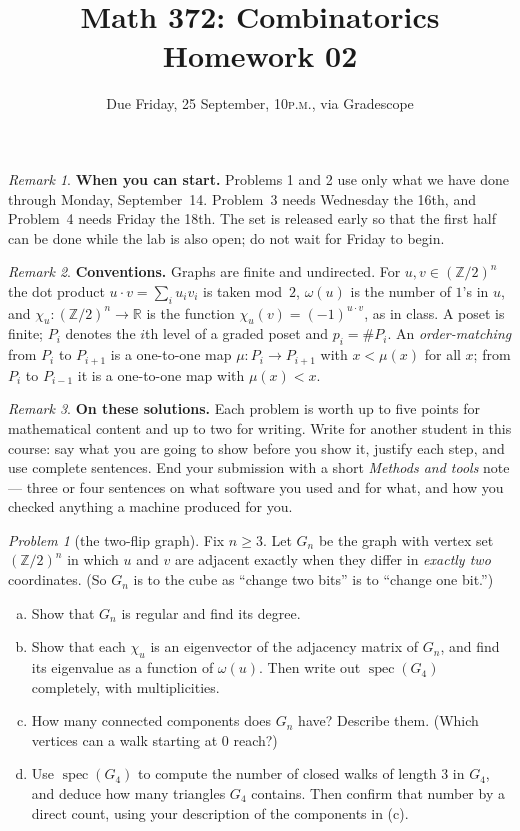 \documentclass[11pt,twoside]{amsart}
\title{Math 372: Combinatorics\\ Homework 02}
\author{Due Friday, 25 September, 10\textsc{p.m.}, via Gradescope}
\theoremstyle{plain}
\theoremstyle{remark}
\newtheorem*{rmk*}{Remark}
\newtheorem{prob}{Problem}
\theoremstyle{definition}
\newcommand{\RR}{\mathbb{R}}
\newcommand{\Ztn}{(\mathbb{Z}/2)^{n}}
\newcommand{\spec}{\operatorname{spec}}
\newcommand{\wt}{\omega}
\begin{document}
\maketitle

\begin{rmk*}
\textbf{When you can start.} Problems 1 and 2 use only what we have done through Monday,
September~14. Problem~3 needs Wednesday the 16th, and Problem~4 needs Friday the 18th. The set is
released early so that the first half can be done while the lab is also open; do not wait for
Friday to begin.
\end{rmk*}

\begin{rmk*}
\textbf{Conventions.} Graphs are finite and undirected. For $u,v\in\Ztn$ the dot product
$u\cdot v=\sum_i u_iv_i$ is taken mod~$2$, $\wt(u)$ is the number of $1$'s in $u$, and
$\chi_u\colon\Ztn\to\RR$ is the function $\chi_u(v)=(-1)^{u\cdot v}$, as in class. A poset is
finite; $P_i$ denotes the $i$th level of a graded poset and $p_i=\#P_i$. An \emph{order-matching}
from $P_i$ to $P_{i+1}$ is a one-to-one map $\mu\colon P_i\to P_{i+1}$ with $x<\mu(x)$ for all
$x$; from $P_{i}$ to $P_{i-1}$ it is a one-to-one map with $\mu(x)<x$.
\end{rmk*}

\begin{rmk*}
\textbf{On these solutions.} Each problem is worth up to five points for mathematical content
and up to two for writing. Write for another student in this course: say what you are going to
show before you show it, justify each step, and use complete sentences. End your submission with
a short \emph{Methods and tools} note --- three or four sentences on what software you used and
for what, and how you checked anything a machine produced for you.
\end{rmk*}

\begin{prob}[the two-flip graph]
Fix $n\ge3$. Let $G_n$ be the graph with vertex set $\Ztn$ in which $u$ and $v$ are adjacent
exactly when they differ in \emph{exactly two} coordinates. (So $G_n$ is to the cube as ``change
two bits'' is to ``change one bit.'')
\begin{enumerate}[(a)]
\item Show that $G_n$ is regular and find its degree.
\item Show that each $\chi_u$ is an eigenvector of the adjacency matrix of $G_n$, and find its
eigenvalue as a function of $\wt(u)$. Then write out $\spec(G_4)$ completely, with
multiplicities.
\item How many connected components does $G_n$ have? Describe them. (Which vertices can a walk
starting at $0$ reach?)
\item Use $\spec(G_4)$ to compute the number of closed walks of length $3$ in $G_4$, and deduce
how many triangles $G_4$ contains. Then confirm that number by a direct count, using your
description of the components in (c).
\end{enumerate}
\end{prob}
\end{document}
